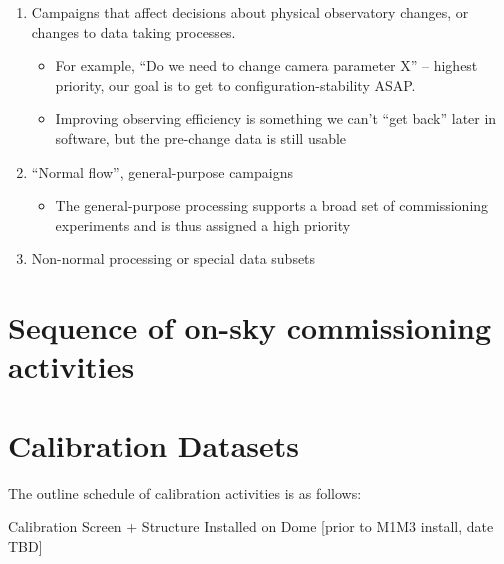 \documentclass[SE,authoryear,toc,lsstdraft]{lsstdoc}
\begin{document}
\begin{enumerate}

  \item Campaigns that affect decisions about physical observatory changes, or changes to data taking processes.

  \begin{itemize}

    \item  For example, ``Do we need to change camera parameter X'' -- highest priority, our goal is to get to configuration-stability ASAP.

    \item Improving observing efficiency is something we can't ``get back'' later in software, but the pre-change data is still usable

  \end{itemize}

  \item ``Normal flow'', general-purpose campaigns

  \begin{itemize}

    \item The general-purpose processing supports a broad set of commissioning experiments and is thus assigned a high priority

  \end{itemize}

  \item Non-normal processing or special data subsets

\end{enumerate}

\section{Sequence of on-sky commissioning activities}

\section{Calibration Datasets}


The outline schedule of calibration activities is as follows:

Calibration Screen + Structure Installed on Dome [prior to M1M3 install, date TBD]
\end{document}

